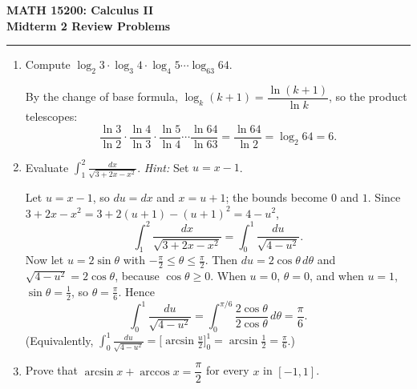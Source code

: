 \documentclass[12pt,letterpaper]{article}
\newif\ifsolutions
\begin{document}
\begin{center}
  {\large\bfseries MATH 15200: Calculus II}\\
  {\large\bfseries Midterm 2 Review Problems}
  \ifsolutions\\[0.3em]{\color{blue!55!black}\large\bfseries SOLUTIONS}\fi
\end{center}

\vspace{0.25em}
\hrule
\vspace{0.8em}


\vspace{0.5em}

\begin{enumerate}[label=\textbf{\arabic*.},leftmargin=2em,itemsep=1.25em]
  \item Compute
    \(
      \log_2 3\cdot\log_3 4\cdot\log_4 5\cdots\log_{63}64.
    \)

    \begin{solution}
      By the change of base formula, $\log_k(k+1)=\dfrac{\ln(k+1)}{\ln k}$,
      so the product telescopes:
      \[
        \frac{\ln 3}{\ln 2}\cdot\frac{\ln 4}{\ln 3}\cdot\frac{\ln 5}{\ln 4}
        \cdots\frac{\ln 64}{\ln 63}
        =\frac{\ln 64}{\ln 2}=\log_2 64=6.
      \]
    \end{solution}

  \item Evaluate
    $\displaystyle\int_1^2\frac{dx}{\sqrt{3+2x-x^2}}$. \emph{Hint:} Set \(u = x-1\).

    \begin{solution}
      Let $u=x-1$, so $du=dx$ and $x=u+1$; the bounds become $0$ and $1$.
      Since $3+2x-x^2=3+2(u+1)-(u+1)^2=4-u^2$,
      \[
        \int_1^2\frac{dx}{\sqrt{3+2x-x^2}}=\int_0^1\frac{du}{\sqrt{4-u^2}}.
      \]
      Now let $u=2\sin\theta$ with $-\frac\pi2\le\theta\le\frac\pi2$. Then
      $du=2\cos\theta\,d\theta$ and $\sqrt{4-u^2}=2\cos\theta$, because
      $\cos\theta\ge0$. When $u=0$, $\theta=0$, and when $u=1$,
      $\sin\theta=\frac12$, so $\theta=\frac\pi6$. Hence
      \[
        \int_0^1\frac{du}{\sqrt{4-u^2}}
        =\int_0^{\pi/6}\frac{2\cos\theta}{2\cos\theta}\,d\theta
        =\frac\pi6.
      \]
      (Equivalently, $\int_0^1\frac{du}{\sqrt{4-u^2}}
      =\bigl[\arcsin\frac u2\bigr]_0^1=\arcsin\frac12=\frac\pi6$.)
    \end{solution}

  \item Prove that $\arcsin x+\arccos x=\dfrac\pi2$ for every $x$ in
    $[-1,1]$.


\end{enumerate}
\end{document}
